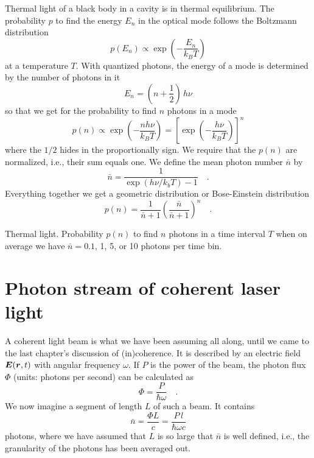 Thermal light of a black body in a cavity is in thermal equilibrium. The probability $p$ to find the energy $E_n$ in the optical mode follows the Boltzmann distribution
\begin{equation}
    p(E_n) \propto \exp \left(  - \frac{E_n}{k_B T} \right)
\end{equation}
at a temperature $T$. With quantized photons, the energy of a mode is determined by the number of photons in it 
\begin{equation}
    E_n = \left( n + \frac{1}{2} \right) \, h \nu
\end{equation}
so that we get for the probability to find $n$ photons in a mode
\begin{equation}
    p(n) \propto  \exp \left(  - \frac{n h \nu}{k_B T} \right) = 
    \left[ \exp \left(  - \frac{h \nu}{k_B T} \right) \right]^n
\end{equation}
where the  $1/2$ hides in the proportionally sign.
We require that the $p(n)$ are normalized, i.e., their sum equals one. We define the mean photon number $\bar{n}$ by
\begin{equation}
    \bar{n} = \frac{1}{\exp( h \nu / k_b T) - 1} \quad .
\end{equation}
Everything together we get a geometric distribution or Bose-Einstein distribution 
\begin{equation}
    p(n) = \frac{1}{\bar{n} + 1} \left(\frac{\bar{n}}{\bar{n} + 1}  \right)^n \quad .
\end{equation}

\begin{marginfigure}
    \caption{Thermal light. Probability $p(n)$ to find $n$ photons in a time interval $T$ when on average we have $\bar{n} = 0.1$, 1, 5, or 10 photons per time bin.}
\end{marginfigure}

\section{Photon stream of coherent laser light}

A coherent light beam is what we have been assuming all along, until we came to the last chapter's discussion of (in)coherence. It is described by an electric field $\boldsymbol{E}(\boldsymbol{r}, t)$ with angular frequency $\omega$. If $P$ is the power of the beam, the photon flux $\Phi$ (units: photons per second) can be calculated as
\begin{equation}
    \Phi = \frac{P}{\hbar \omega} \quad .
\end{equation}
We now imagine a segment of length $L$ of such a beam. It contains
\begin{equation}
 \bar{n} = \frac{\Phi L}{c} = \frac{P \, l}{\hbar \omega c}
\end{equation}
photons, where we have assumed that $L$ is so large that $\bar{n}$ is well defined, i.e., the granularity of the photons has been averaged out. 

